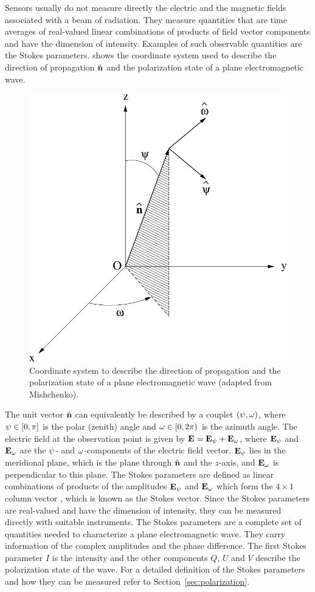 Sensors usually do not measure directly the electric and the magnetic
fields associated with a beam of radiation. They measure quantities
that are time averages of real-valued linear combinations of products
of field vector components and have the dimension of intensity.
Examples of such observable quantities are the Stokes parameters.
 shows the coordinate system used
to describe the direction of propagation $\hat{{\bf n}}$ and the
polarization state of a plane electromagnetic wave.
\begin{figure}[t]
 \begin{center}
   \includegraphics*[width=0.6\hsize]{coordinate_system}
   \caption{Coordinate system to describe the direction of propagation and the polarization state of a plane electromagnetic wave (adapted from Mishchenko).}
  \label{fig:RT_theory_coordinates}  
 \end{center}
\end{figure}
The unit vector $\hat{{\bf n}}$ can equivalently be described by a
couplet $(\psi, \omega)$, where ${\psi \in [0,\pi]}$ is the polar
(zenith) angle and $\omega \in [0,2\pi)$ is the azimuth angle. The
electric field at the observation point is given by $\mathbf{E} =
\mathbf{E}_{\psi} + \mathbf{E}_{\omega}$, where $ \mathbf{E}_{\psi}$ and
$\mathbf{E}_{\omega}$ are the $\psi$- and $\omega$-components of the
electric field vector.  $\mathbf{E}_{\psi}$ lies in the meridional
plane, which is the plane through $\hat{{\bf n}}$ and the $z$-axis, and
$\mathbf{E}_{\omega}$ is perpendicular to this plane.
The Stokes parameters are defined as linear combinations of products
of the amplitudes $\mathbf{E}_{\psi}$ and  $\mathbf{E}_{\omega}$ which
form the $4\times1$ column vector \StoVec,
which is known as the Stokes vector.  Since the Stokes parameters are
real-valued and have the dimension of intensity, they can be measured
directly with suitable instruments. The Stokes parameters are a
complete set of quantities needed to characterize a plane
electromagnetic wave. They carry information of the complex amplitudes
and the phase difference.  The first Stokes parameter $I$ is the
intensity and the other components $Q$, $U$ and $V$ describe the
polarization state of the wave. For a detailed definition of the
Stokes parameters and how they can be measured refer to
Section~\ref{sec:polarization}.

